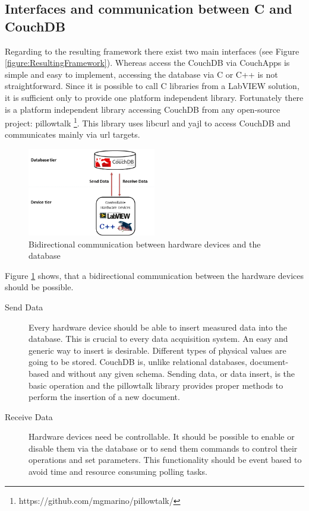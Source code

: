 \subsection{Interfaces and communication between C and CouchDB}
Regarding to the resulting framework there exist two main interfaces (see Figure \ref{figure:ResultingFramework}). Whereas access the CouchDB via CouchApps is simple and easy to implement, accessing the database via C or C++ is not straightforward. Since it is possible to call C libraries from a LabVIEW solution, it is sufficient only to provide one platform independent library. Fortunately there is a platform independent library accessing CouchDB from any open-source project: pillowtalk \footnote{https://github.com/mgmarino/pillowtalk/}. This library uses libcurl and yajl to access CouchDB and communicates mainly via url targets. \\

\begin{figure}[h!]
  \centering
      \includegraphics[width=0.5\textwidth]{images/SendReceiveData.png}
  \caption{Bidirectional communication between hardware devices and the database}
  \label{figure:BidirectionalCommunication}
\end{figure}

Figure \ref{figure:BidirectionalCommunication} shows, that a bidirectional communication between the hardware devices should be possible. 
\begin{description}
     \item[Send Data] Every hardware device should be able to insert measured data into the database. This is crucial to every data acquisition system. An easy and generic way to insert is desirable. Different types of physical values are going to be stored. CouchDB is, unlike relational databases, document-based and without any given schema. Sending data, or data insert, is the basic operation and the pillowtalk library provides proper methods to perform the insertion of a new document. 
     \item[Receive Data] Hardware devices need be controllable. It should be possible to enable or disable them via the database or to send them commands to control their operations and set parameters. This functionality should be event based to avoid time and resource consuming polling tasks. 
\end{description}


